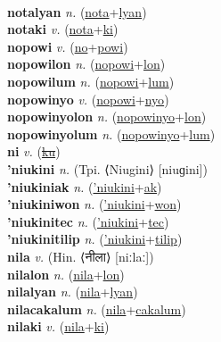  \label{notalum} \\
\textbf{notalyan} \textit{n.} (\hyperref[nota]{nota}+\hyperref[lyan]{lyan})
 \label{notalyan} \\
\textbf{notaki} \textit{v.} (\hyperref[nota]{nota}+\hyperref[ki]{ki})
 \label{notaki} \\
\textbf{nopowi} \textit{v.} (\hyperref[no]{no}+\hyperref[powi]{powi})
 \label{nopowi} \\
\textbf{nopowilon} \textit{n.} (\hyperref[nopowi]{nopowi}+\hyperref[lon]{lon})
 \label{nopowilon} \\
\textbf{nopowilum} \textit{n.} (\hyperref[nopowi]{nopowi}+\hyperref[lum]{lum})
 \label{nopowilum} \\
\textbf{nopowinyo} \textit{v.} (\hyperref[nopowi]{nopowi}+\hyperref[nyo]{nyo})
 \label{nopowinyo} \\
\textbf{nopowinyolon} \textit{n.} (\hyperref[nopowinyo]{nopowinyo}+\hyperref[lon]{lon})
 \label{nopowinyolon} \\
\textbf{nopowinyolum} \textit{n.} (\hyperref[nopowinyo]{nopowinyo}+\hyperref[lum]{lum})
 \label{nopowinyolum} \\
\textbf{ni} \textit{v.} (\hyperref[ku]{\sout{ku}})
 \label{ni} \\
\textbf{'niukini} \textit{n.} (Tpi. ⟨Niugini⟩ [niuɡini])
 \label{'niukini} \\
\textbf{'niukiniak} \textit{n.} (\hyperref['niukini]{'niukini}+\hyperref[ak]{ak})
 \label{'niukiniak} \\
\textbf{'niukiniwon} \textit{n.} (\hyperref['niukini]{'niukini}+\hyperref[won]{won})
 \label{'niukiniwon} \\
\textbf{'niukinitec} \textit{n.} (\hyperref['niukini]{'niukini}+\hyperref[tec]{tec})
 \label{'niukinitec} \\
\textbf{'niukinitilip} \textit{n.} (\hyperref['niukini]{'niukini}+\hyperref[tilip]{tilip})
 \label{'niukinitilip} \\
\textbf{nila} \textit{v.} (Hin. ⟨नीला⟩ [niːlaː])
 \label{nila} \\
\textbf{nilalon} \textit{n.} (\hyperref[nila]{nila}+\hyperref[lon]{lon})
 \label{nilalon} \\
\textbf{nilalyan} \textit{n.} (\hyperref[nila]{nila}+\hyperref[lyan]{lyan})
 \label{nilalyan} \\
\textbf{nilacakalum} \textit{n.} (\hyperref[nila]{nila}+\hyperref[cakalum]{cakalum})
 \label{nilacakalum} \\
\textbf{nilaki} \textit{v.} (\hyperref[nila]{nila}+\hyperref[ki]{ki})
